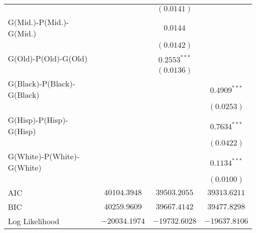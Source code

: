 \begin{center}
\begin{longtable}{l c c c}
                           &                 & $(0.0141)$      &                 \\
G(Mid.)-P(Mid.)-G(Mid.)    &                 & $0.0144$        &                 \\
                           &                 & $(0.0142)$      &                 \\
G(Old)-P(Old)-G(Old)       &                 & $0.2553^{***}$  &                 \\
                           &                 & $(0.0136)$      &                 \\
G(Black)-P(Black)-G(Black) &                 &                 & $0.4909^{***}$  \\
                           &                 &                 & $(0.0253)$      \\
G(Hisp)-P(Hisp)-G(Hisp)    &                 &                 & $0.7634^{***}$  \\
                           &                 &                 & $(0.0422)$      \\
G(White)-P(White)-G(White) &                 &                 & $0.1134^{***}$  \\
                           &                 &                 & $(0.0100)$      \\
\midrule
AIC                        & $40104.3948$    & $39503.2055$    & $39313.6211$    \\
BIC                        & $40259.9609$    & $39667.4142$    & $39477.8298$    \\
Log Likelihood             & $-20034.1974$   & $-19732.6028$   & $-19637.8106$   \\
\end{longtable}
\end{center}
